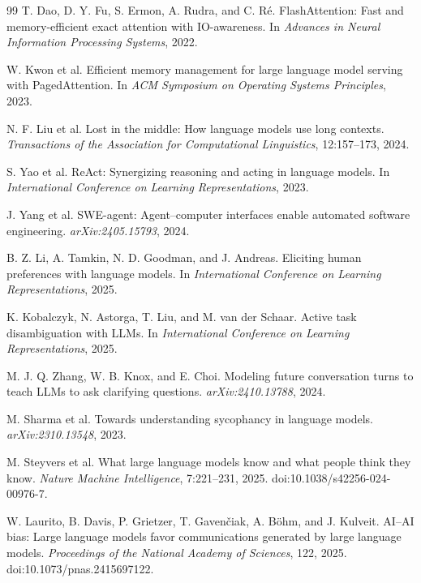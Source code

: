 \documentclass[11pt,a4paper]{article}
\begin{document}
\begin{thebibliography}{99}
T. Dao, D. Y. Fu, S. Ermon, A. Rudra, and C. R\'e.
\newblock FlashAttention: Fast and memory-efficient exact attention with IO-awareness.
\newblock In \emph{Advances in Neural Information Processing Systems}, 2022.

W. Kwon et al.
\newblock Efficient memory management for large language model serving with PagedAttention.
\newblock In \emph{ACM Symposium on Operating Systems Principles}, 2023.

N. F. Liu et al.
\newblock Lost in the middle: How language models use long contexts.
\newblock \emph{Transactions of the Association for Computational Linguistics}, 12:157--173, 2024.

S. Yao et al.
\newblock ReAct: Synergizing reasoning and acting in language models.
\newblock In \emph{International Conference on Learning Representations}, 2023.

J. Yang et al.
\newblock SWE-agent: Agent--computer interfaces enable automated software engineering.
\newblock \emph{arXiv:2405.15793}, 2024.

B. Z. Li, A. Tamkin, N. D. Goodman, and J. Andreas.
\newblock Eliciting human preferences with language models.
\newblock In \emph{International Conference on Learning Representations}, 2025.

K. Kobalczyk, N. Astorga, T. Liu, and M. van der Schaar.
\newblock Active task disambiguation with LLMs.
\newblock In \emph{International Conference on Learning Representations}, 2025.

M. J. Q. Zhang, W. B. Knox, and E. Choi.
\newblock Modeling future conversation turns to teach LLMs to ask clarifying questions.
\newblock \emph{arXiv:2410.13788}, 2024.

M. Sharma et al.
\newblock Towards understanding sycophancy in language models.
\newblock \emph{arXiv:2310.13548}, 2023.

M. Steyvers et al.
\newblock What large language models know and what people think they know.
\newblock \emph{Nature Machine Intelligence}, 7:221--231, 2025.
\newblock doi:10.1038/s42256-024-00976-7.

W. Laurito, B. Davis, P. Grietzer, T. Gaven\v{c}iak, A. B\"ohm, and J. Kulveit.
\newblock AI--AI bias: Large language models favor communications generated by large language models.
\newblock \emph{Proceedings of the National Academy of Sciences}, 122, 2025.
\newblock doi:10.1073/pnas.2415697122.


\end{thebibliography}
\end{document}
